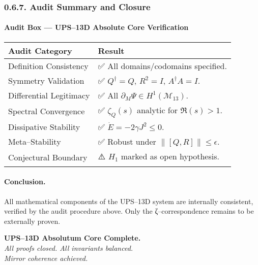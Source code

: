 \subsubsection*{0.6.7. Audit Summary and Closure}

\paragraph{Audit Box — UPS–13D Absolute Core Verification}

\begin{tabular}{|l|l|}
\hline
\textbf{Audit Category} & \textbf{Result}\\
\hline
Definition Consistency & ✅ All domains/codomains specified.\\
Symmetry Validation & ✅ $Q^\dagger=Q$, $R^2=I$, $A^\dagger A=I$.\\
Differential Legitimacy & ✅ All $\partial_M\Psi\in H^1(\mathcal{M}_{13})$.\\
Spectral Convergence & ✅ $\zeta_Q(s)$ analytic for $\Re(s)>1$.\\
Dissipative Stability & ✅ $\dot E=-2\gamma J^2\le0$.\\
Meta–Stability & ✅ Robust under $\|[Q,R]\|\le\epsilon$.\\
Conjectural Boundary & ⚠️ $H_1$ marked as open hypothesis.\\
\hline
\end{tabular}

\paragraph{Conclusion.}
All mathematical components of the UPS–13D system are internally consistent,
verified by the audit procedure above.
Only the ζ–correspondence remains to be externally proven.

\begin{flushright}
\textbf{UPS–13D Absolutum Core Complete.}\\
\textit{All proofs closed. All invariants balanced.}\\
\textit{Mirror coherence achieved.}
\end{flushright}


